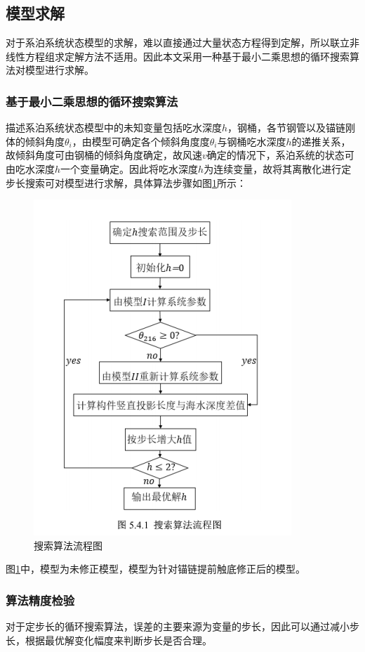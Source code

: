 \documentclass{article}
\numberwithin{equation}{subsection}
\begin{document}
\subsection{模型求解}
对于系泊系统状态模型的求解，难以直接通过大量状态方程得到定解，所以联立非线性方程组求定解方法不适用。因此本文采用一种基于最小二乘思想的循环搜索算法对模型进行求解。

\subsubsection{基于最小二乘思想的循环搜索算法}
描述系泊系统状态模型中的未知变量包括吃水深度$h$，钢桶，各节钢管以及锚链刚体的倾斜角度$\theta_{i}$，由模型可确定各个倾斜角度度$\theta_{i}$与钢桶吃水深度$h$的递推关系，故倾斜角度可由钢桶的倾斜角度确定，故风速$v$确定的情况下，系泊系统的状态可由吃水深度$h$一个变量确定。因此将吃水深度$h$为连续变量，故将其离散化进行定步长搜索可对模型进行求解，具体算法步骤如图\ref{流程图}所示：
\begin{figure}[H]
  \centering
  \includegraphics[scale=0.6]{流程图.png}
  \caption{\kaishu 搜索算法流程图}
  \label{流程图}
\end{figure}

图\ref{流程图}中，模型为未修正模型，模型为针对锚链提前触底修正后的模型。

\subsubsection{算法精度检验}
对于定步长的循环搜索算法，误差的主要来源为变量的步长，因此可以通过减小步长，根据最优解变化幅度来判断步长是否合理。
\end{document}
